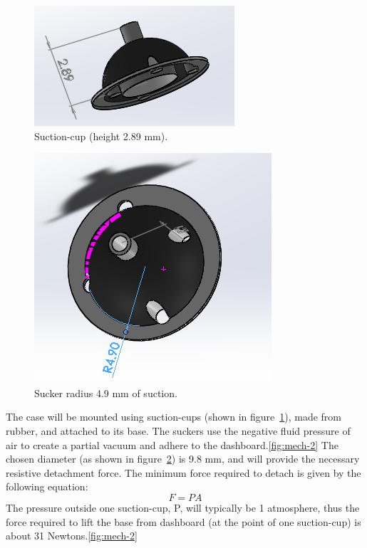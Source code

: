 \newpage
{}
\begin{figure}[H]
\begin{center}
\includegraphics[scale=0.6]{data/mechanical/3.png}
\caption{Suction-cup (height 2.89 mm).}
\label{fig:mech-3}
\end{center}
\end{figure}

\begin{figure}[H]
\begin{center}
\includegraphics[scale=0.5]{data/mechanical/4.png}
\caption{Sucker radius 4.9 mm of suction.}
\label{fig:mech-4}
\end{center}
\end{figure}

The case will be mounted using suction-cups (shown in figure~\ref{fig:mech-3}), made from rubber, and attached to its base. The suckers use the negative fluid pressure of air to create a partial vacuum and adhere to the dashboard.\ref{fig:mech-2} The chosen diameter (as shown in figure~\ref{fig:mech-4}) is 9.8 mm, and will provide the necessary resistive detachment force. The minimum force required to detach is given by the following equation:
$$F=PA$$
The pressure outside one suction-cup, P, will typically be 1 atmosphere, thus the force required to lift the base from dashboard (at the point of one suction-cup) is about 31 Newtons.\ref{fig:mech-2}

